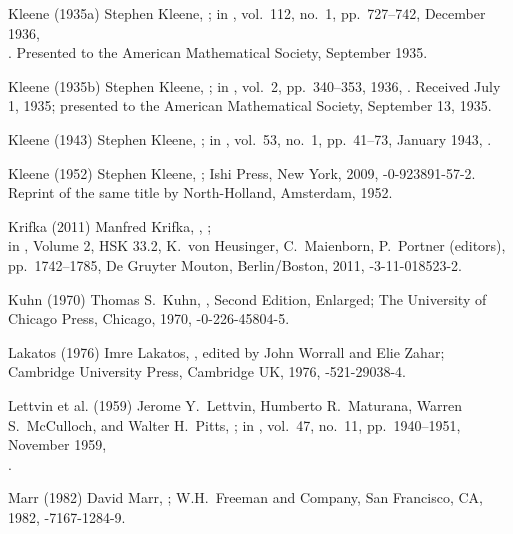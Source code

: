 \biblabel Kleene (1935a)
Stephen Kleene,
;
in ,
vol.\ 112, no.\ 1, pp.\ 727--742, December 1936,\\
.
Presented to the American Mathematical Society,
September 1935.

\biblabel Kleene (1935b)
Stephen Kleene,
;
in ,
vol.\ 2, pp.\ 340--353, 1936,
.
Received July 1, 1935;
presented to the American Mathematical Society, September 13, 1935.

\biblabel Kleene (1943)
Stephen Kleene,
;
in ,
vol.\ 53, no.\ 1, pp.\ 41--73, January 1943,
.

\biblabel Kleene (1952)
Stephen Kleene,
;
Ishi Press, New York, 2009,
-0-923891-57-2.
Reprint of the same title by
North-Holland, Amsterdam, 1952.

\biblabel Krifka (2011)
Manfred Krifka,
,
;\\
in ,
 Volume 2, HSK 33.2,
 K.\ von Heusinger, C.\ Maienborn, P.\ Portner (editors),
pp.\ 1742--1785,
De Gruyter Mouton, Berlin/Boston, 2011,
-3-11-018523-2.

\biblabel Kuhn (1970)
Thomas S.\ Kuhn,
,
Second Edition, Enlarged;
The University of Chicago Press, Chicago, 1970,
-0-226-45804-5.

\biblabel Lakatos (1976)
Imre Lakatos,
,
edited by John Worrall and Elie Zahar;
Cambridge University Press, Cambridge UK, 1976,
-521-29038-4.

\biblabel Lettvin et al. (1959)
Jerome Y.\ Lettvin, Humberto R.\ Maturana,
Warren S.\ McCulloch, and Walter H.\ Pitts,
;
in ,
vol.\ 47, no.\ 11, pp.\ 1940--1951, November 1959,\\
.

\biblabel Marr (1982)
David Marr,
;
W.H.\ Freeman and Company, San Francisco, CA, 1982,
-7167-1284-9.

